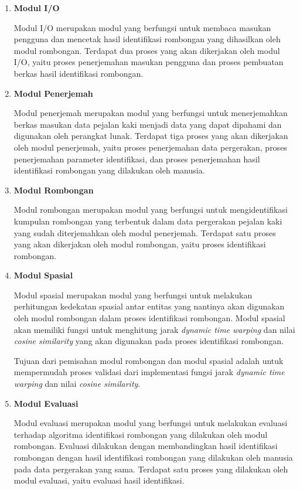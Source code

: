 \begin{enumerate}
    \item \textbf{Modul I/O}
    
    Modul I/O merupakan modul yang berfungsi untuk membaca masukan pengguna dan mencetak hasil identifikasi rombongan yang dihasilkan oleh modul rombongan. Terdapat dua proses yang akan dikerjakan oleh modul I/O, yaitu proses penerjemahan masukan pengguna dan proses pembuatan berkas hasil identifikasi rombongan.
    
    \item \textbf{Modul Penerjemah}
    
    Modul penerjemah merupakan modul yang berfungsi untuk menerjemahkan berkas masukan data pejalan kaki menjadi data yang dapat dipahami dan digunakan oleh perangkat lunak. Terdapat tiga proses yang akan dikerjakan oleh modul penerjemah, yaitu proses penerjemahan data pergerakan, proses penerjemahan parameter identifikasi, dan proses penerjemahan hasil identifikasi rombongan yang dilakukan oleh manusia.
    
    \item \textbf{Modul Rombongan}
    
    Modul rombongan merupakan modul yang berfungsi untuk mengidentifikasi kumpulan rombongan yang terbentuk dalam data pergerakan pejalan kaki yang sudah diterjemahkan oleh modul penerjemah. Terdapat satu proses yang akan dikerjakan oleh modul rombongan, yaitu proses identifikasi rombongan.

    \item \textbf{Modul Spasial}
    
    Modul spasial merupakan modul yang berfungsi untuk melakukan perhitungan kedekatan spasial antar entitas yang nantinya akan digunakan oleh modul rombongan dalam proses identifikasi rombongan. Modul spasial akan memiliki fungsi untuk menghitung jarak \textit{dynamic time warping} dan nilai \textit{cosine similarity} yang akan digunakan pada proses identifikasi rombongan.
    
    Tujuan dari pemisahan modul rombongan dan modul spasial adalah untuk mempermudah proses validasi dari implementasi fungsi jarak \textit{dynamic time warping} dan nilai \textit{cosine similarity}.
    
    \item \textbf{Modul Evaluasi}
    
    Modul evaluasi merupakan modul yang berfungsi untuk melakukan evaluasi terhadap algoritma identifikasi rombongan yang dilakukan oleh modul rombongan. Evaluasi dilakukan dengan membandingkan hasil identifikasi rombongan dengan hasil identifikasi rombongan yang dilakukan oleh manusia pada data pergerakan yang sama. Terdapat satu proses yang dilakukan oleh modul evaluasi, yaitu evaluasi hasil identifikasi.
\end{enumerate}

